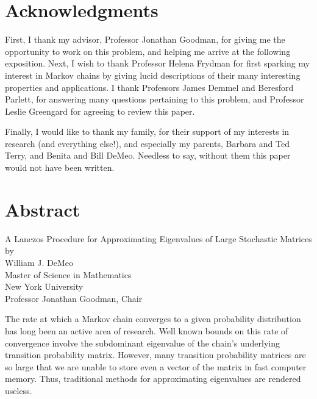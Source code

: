 \documentclass[12pt,letterpaper]{report}
\theoremstyle{plain}
\theoremstyle{definition}
\theoremstyle{remark}
\numberwithin{theorem}{chapter}
\numberwithin{claim}{chapter}
\numberwithin{equation}{chapter}
\numberwithin{conjecture}{chapter}
\newcommand\<{\ensuremath{\langle}}
\renewcommand\>{\ensuremath{\rangle}}
\begin{document}
\section*{Acknowledgments}
First, I thank my advisor, Professor Jonathan Goodman, for giving me the opportunity to work on
this problem, and helping me arrive at the following exposition. Next, I wish to thank Professor
Helena Frydman for ﬁrst sparking my interest in Markov chains by giving lucid descriptions of their
many interesting properties and applications. I thank Professors James Demmel and Beresford
Parlett, for answering many questions pertaining to this problem, and Professor Leslie Greengard
for agreeing to review this paper.

Finally, I would like to thank my family, for their support of my interests in research (and
everything else!), and especially my parents, Barbara and Ted Terry, and Benita and Bill DeMeo.
Needless to say, without them this paper would not have been written.


\newpage
\section*{Abstract}
\begin{center}
\newcommand\skipsize{6pt}
A Lanczos Procedure for Approximating Eigenvalues of Large Stochastic Matrices\\[\skipsize]
by\\[\skipsize]
William J. DeMeo\\[\skipsize]
Master of Science in Mathematics\\[\skipsize]
New York University\\[\skipsize]
Professor Jonathan Goodman, Chair
\end{center}

The rate at which a Markov chain converges to a given probability distribution
has long been an active area of research. Well known bounds on this rate of
convergence involve the subdominant eigenvalue of the chain's underlying
transition probability matrix. However, many transition probability matrices are
so large that we are unable to store even a vector of the matrix in fast
computer memory. Thus, traditional methods for approximating eigenvalues are
rendered useless. 
\end{document}
